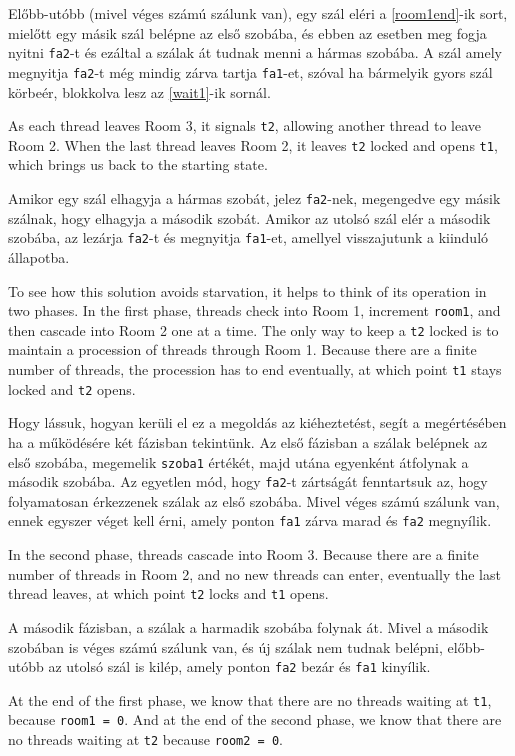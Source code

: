 \documentclass{book}
\begin{document}
Előbb-utóbb (mivel véges számú szálunk van), egy szál eléri a \ref{room1end}-ik sort, mielőtt
egy másik szál belépne az első szobába, és ebben az esetben meg fogja
nyitni {\tt fa2}-t és ezáltal a szálak át tudnak menni a hármas szobába. A szál
amely megnyitja {\tt fa2}-t még mindig zárva tartja {\tt fa1}-et, szóval ha bármelyik gyors
szál körbeér, blokkolva lesz az \ref{wait1}-ik sornál.

As each thread leaves Room 3, it signals {\tt t2}, allowing another
thread to leave Room 2.  When the last thread leaves Room 2, it leaves
{\tt t2} locked and opens {\tt t1}, which brings us back to the
starting state.

Amikor egy szál elhagyja a hármas szobát, jelez {\tt fa2}-nek, megengedve egy
másik szálnak, hogy elhagyja a második szobát. Amikor az utolsó szál elér a második
szobába, az lezárja {\tt fa2}-t és megnyitja {\tt fa1}-et, amellyel visszajutunk a kiinduló állapotba.

To see how this solution avoids starvation, it helps to think of its
operation in two phases.  In the first phase, threads check into Room
1, increment {\tt room1}, and then cascade into Room 2 one at a time.
The only way to keep a {\tt t2} locked is to maintain a
procession of threads through Room 1.  Because there are a finite
number of threads, the procession has to end eventually, at which
point {\tt t1} stays locked and {\tt t2} opens.

Hogy lássuk, hogyan kerüli el ez a megoldás az kiéheztetést, segít a megértésében
ha a működésére két fázisban tekintünk. Az első fázisban a szálak belépnek az első
szobába, megemelik {\tt szoba1} értékét, majd utána egyenként átfolynak a második szobába.
Az egyetlen mód, hogy {\tt fa2}-t zártságát fenntartsuk az, hogy folyamatosan
érkezzenek szálak az első szobába. Mivel véges számú szálunk van, ennek
egyszer véget kell érni, amely ponton {\tt fa1} zárva marad és {\tt fa2} megnyílik.

In the second phase, threads cascade into Room 3.  
Because there are a finite number of threads in Room 2, and
no new threads can enter, eventually the last thread leaves, at
which point {\tt t2} locks and {\tt t1} opens.

A második fázisban, a szálak a harmadik szobába folynak át. Mivel a második
szobában is véges számú szálunk van, és új szálak nem tudnak belépni,
előbb-utóbb az utolsó szál is kilép, amely ponton {\tt fa2} bezár és {\tt fa1} kinyílik.

At the end of the first phase, we know that there are no threads
waiting at {\tt t1}, because {\tt room1 = 0}.  And at the end of the
second phase, we know that there are no threads waiting at {\tt t2}
because {\tt room2 = 0}.
\end{document}
